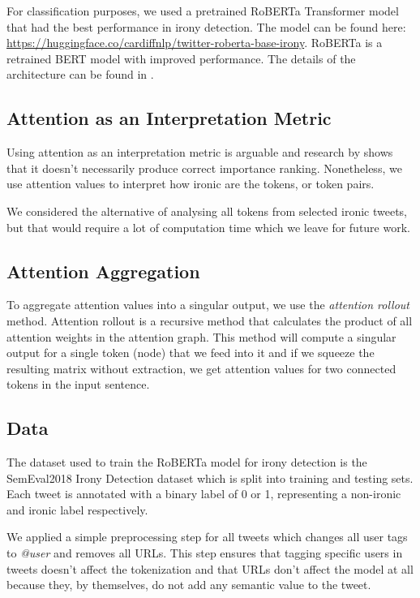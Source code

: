 \documentclass[10pt, a4paper]{article}
\begin{document}
For classification purposes, we used a pretrained RoBERTa Transformer model that had the best performance in irony detection.
The model can be found here: \url{https://huggingface.co/cardiffnlp/twitter-roberta-base-irony}.
RoBERTa is a retrained BERT model with improved performance. The details of the architecture can be found in \citep{roberta}. 

\subsection{Attention as an Interpretation Metric}

Using attention as an interpretation metric is arguable and research by \cite{attention-interpretable} shows that it doesn't necessarily produce correct importance ranking.
Nonetheless, we use attention values to interpret how ironic are the tokens, or token pairs.

We considered the alternative of analysing all tokens from selected ironic tweets, but that would require a lot of computation time which we leave for future work.

\subsection{Attention Aggregation}
\label{sec:attaggr}

To aggregate attention values into a singular output, we use the \textit{attention rollout} method.
Attention rollout is a recursive method that calculates the product of all attention weights in the attention graph. \citep{quantifying-attention-flow}
This method will compute a singular output for a single token (node) that we feed into it and if we squeeze the resulting matrix without extraction, we get attention values for two connected tokens in the input sentence.

\subsection{Data}

The dataset used to train the RoBERTa model for irony detection is the SemEval2018 Irony Detection dataset \citep{van-hee-etal-2018-semeval} which is split into training and testing sets.
Each tweet is annotated with a binary label of 0 or 1, representing a non-ironic and ironic label respectively.

We applied a simple preprocessing step for all tweets which changes all user tags to \textit{@user} and removes all URLs.
This step ensures that tagging specific users in tweets doesn't affect the tokenization and that URLs don't affect the model at all because they, by themselves, do not add any semantic value to the tweet.
\end{document}
